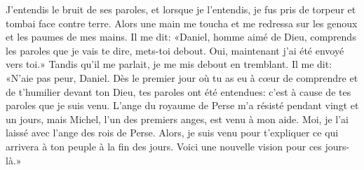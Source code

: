 J’entendis le bruit de ses paroles,
	et lorsque je l’entendis, je fus pris de torpeur et tombai face contre terre.
Alors une main me toucha et me redressa sur les genoux et les paumes de mes mains.
Il me dit: «Daniel, homme aimé de Dieu,
	comprends les paroles que je vais te dire, mets-toi debout.
	Oui, maintenant j’ai été envoyé vers toi.»
Tandis qu’il me parlait, je me mis debout en tremblant.
Il me dit: «N’aie pas peur, Daniel.
	Dès le premier jour où tu as eu à cœur de comprendre et de t’humilier devant ton Dieu,
	tes paroles ont été entendues:
	c’est à cause de tes paroles que je suis venu.
L’ange du royaume de Perse m’a résisté pendant vingt et un jours,
	mais Michel, l’un des premiers anges, est venu à mon aide.
	Moi, je l’ai laissé avec l’ange des rois de Perse.
Alors, je suis venu pour t’expliquer ce qui arrivera à ton peuple à la fin des jours.
	Voici une nouvelle vision pour ces jours-là.»
